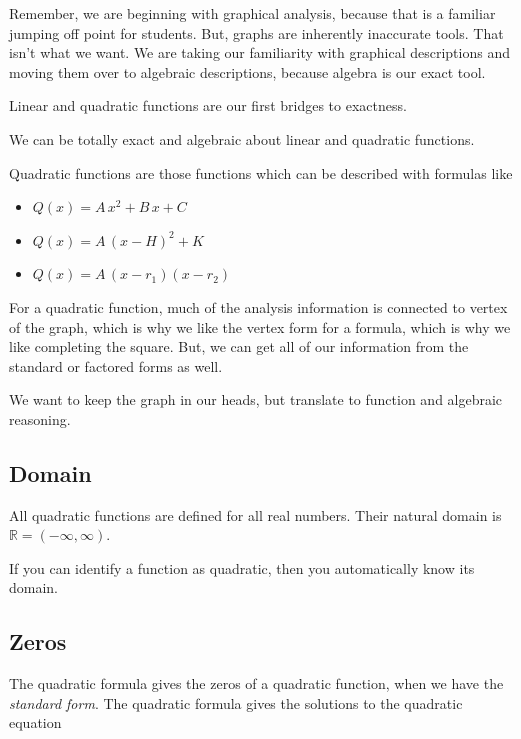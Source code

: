 \documentclass{ximera}
\begin{document}
Remember, we are beginning with graphical analysis, because that is a familiar jumping off point for students.  But, graphs are inherently inaccurate tools.  That isn't what we want. We are taking our familiarity with graphical descriptions and moving them over to algebraic descriptions, because algebra is our exact tool. 

Linear and quadratic functions are our first bridges to exactness. 

We can be totally exact and algebraic about linear and quadratic functions.


Quadratic functions are those functions which can be described with formulas like

\begin{itemize}
     \item $Q(x) = A \, x^2 + B \, x + C$
     \item $Q(x) = A \, (x - H)^2 + K$
     \item $Q(x) = A \, (x - r_1) (x-r_2)$
\end{itemize}

For a quadratic function, much of the analysis information is connected to vertex of the graph, which is why we like the vertex form for a formula, which is why we like completing the square.  But, we can get all of our information from the standard or factored forms as well. 

We want to keep the graph in our heads, but translate to function and algebraic reasoning. 





\subsection*{Domain} 

All quadratic functions are defined for all real numbers.  Their natural domain is $\mathbb{R} = (-\infty, \infty)$. 

If you can identify a function as quadratic, then you automatically know its domain. 











\subsection*{Zeros}


The quadratic formula gives the zeros of a quadratic function, when we have the \textit{standard form}. The quadratic formula gives the solutions to the quadratic equation
\end{document}
